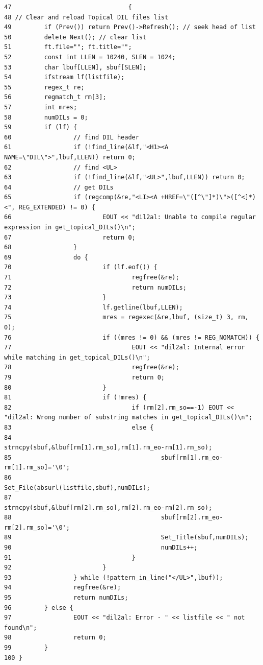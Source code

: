 \footnotesize\begin{verbatim}47                                {
48 // Clear and reload Topical DIL files list
49         if (Prev()) return Prev()->Refresh(); // seek head of list
50         delete Next(); // clear list
51         ft.file=""; ft.title="";
52         const int LLEN = 10240, SLEN = 1024;
53         char lbuf[LLEN], sbuf[SLEN];
54         ifstream lf(listfile);
55         regex_t re;
56         regmatch_t rm[3];
57         int mres;
58         numDILs = 0;
59         if (lf) {
60                 // find DIL header
61                 if (!find_line(&lf,"<H1><A NAME=\"DIL\">",lbuf,LLEN)) return 0;
62                 // find <UL>
63                 if (!find_line(&lf,"<UL>",lbuf,LLEN)) return 0;
64                 // get DILs
65                 if (regcomp(&re,"<LI><A +HREF=\"([^\"]*)\">([^<]*)<", REG_EXTENDED) != 0) {
66                         EOUT << "dil2al: Unable to compile regular expression in get_topical_DILs()\n";
67                         return 0;
68                 }
69                 do {
70                         if (lf.eof()) {
71                                 regfree(&re);
72                                 return numDILs;
73                         }
74                         lf.getline(lbuf,LLEN);
75                         mres = regexec(&re,lbuf, (size_t) 3, rm, 0);
76                         if ((mres != 0) && (mres != REG_NOMATCH)) {
77                                 EOUT << "dil2al: Internal error while matching in get_topical_DILs()\n";
78                                 regfree(&re);
79                                 return 0;
80                         }
81                         if (!mres) {
82                                 if (rm[2].rm_so==-1) EOUT << "dil2al: Wrong number of substring matches in get_topical_DILs()\n";
83                                 else {
84                                         strncpy(sbuf,&lbuf[rm[1].rm_so],rm[1].rm_eo-rm[1].rm_so);
85                                         sbuf[rm[1].rm_eo-rm[1].rm_so]='\0';
86                                         Set_File(absurl(listfile,sbuf),numDILs);
87                                         strncpy(sbuf,&lbuf[rm[2].rm_so],rm[2].rm_eo-rm[2].rm_so);
88                                         sbuf[rm[2].rm_eo-rm[2].rm_so]='\0';
89                                         Set_Title(sbuf,numDILs);
90                                         numDILs++;
91                                 }
92                         }
93                 } while (!pattern_in_line("</UL>",lbuf));
94                 regfree(&re);
95                 return numDILs;
96         } else {
97                 EOUT << "dil2al: Error - " << listfile << " not found\n";
98                 return 0;
99         }
100 }
\end{verbatim}\normalsize 
{}
